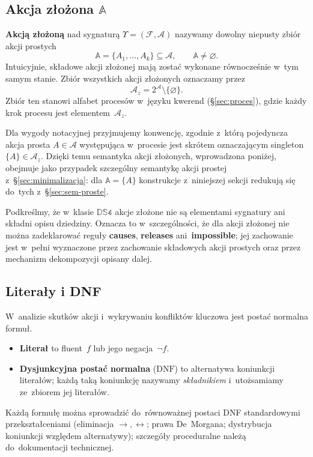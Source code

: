 \documentclass[11pt,a4paper]{article}
\newcommand{\causes}{\textbf{causes}}
\newcommand{\impossible}{\textbf{impossible}}
\newcommand{\releases}{\textbf{releases}}
\theoremstyle{definition}
\begin{document}
\subsection{Akcja złożona \texorpdfstring{$\mathbb{A}$}{A}}
\label{sec:akcja-zlozona}

\textbf{Akcją złożoną} nad sygnaturą $\Upsilon=(\mathcal{F},\mathcal{A})$
nazywamy dowolny niepusty zbiór akcji prostych
\[
  \mathbb{A} = \{A_1, \ldots, A_k\} \subseteq \mathcal{A},
  \qquad \mathbb{A} \neq \varnothing.
\]
Intuicyjnie, składowe akcji złożonej mają zostać wykonane równocześnie
w~tym samym stanie. Zbiór wszystkich akcji złożonych oznaczamy przez
\[
  \mathcal{A}_z = 2^{\mathcal{A}} \setminus \{\varnothing\}.
\]
Zbiór ten stanowi alfabet procesów w~języku kwerend (\S\ref{sec:proces}),
gdzie każdy krok procesu jest elementem~$\mathcal{A}_z$.

Dla wygody notacyjnej przyjmujemy konwencję, zgodnie z~którą pojedyncza
akcja prosta $A \in \mathcal{A}$ występująca w~procesie jest skrótem
oznaczającym singleton $\{A\} \in \mathcal{A}_z$. Dzięki temu semantyka
akcji złożonych, wprowadzona poniżej, obejmuje jako przypadek szczególny
semantykę akcji prostej z~\S\ref{sec:minimalizacja}: dla
$\mathbb{A} = \{A\}$ konstrukcje z~niniejszej sekcji redukują się do~tych
z~\S\ref{sec:sem-proste}.

Podkreślmy, że w~klasie $\mathbb{DS4}$ akcje złożone nie są elementami
sygnatury ani składni opisu dziedziny. Oznacza to w~szczególności, że
dla akcji złożonej nie można zadeklarować reguły \causes{}, \releases{}
ani~\impossible{}; jej zachowanie jest w~pełni wyznaczone przez
zachowanie składowych akcji prostych oraz przez mechanizm dekompozycji
opisany dalej.

\subsection{Literały i DNF}

W~analizie skutków akcji i~wykrywaniu konfliktów kluczowa jest postać normalna formuł.
\begin{itemize}
  \item \textbf{Literał} to fluent~$f$ lub jego negacja~$\neg f$.
  \item \textbf{Dysjunkcyjna postać normalna} ($\mathrm{DNF}$) to alternatywa koniunkcji literałów; każdą taką koniunkcję nazywamy \emph{składnikiem} i~utożsamiamy ze~zbiorem jej literałów.
\end{itemize}
Każdą formułę można sprowadzić do~równoważnej postaci DNF standardowymi przekształceniami (eliminacja $\to,\leftrightarrow$; prawa De~Morgana; dystrybucja koniunkcji względem alternatywy); szczegóły proceduralne należą do~dokumentacji technicznej.
\end{document}
